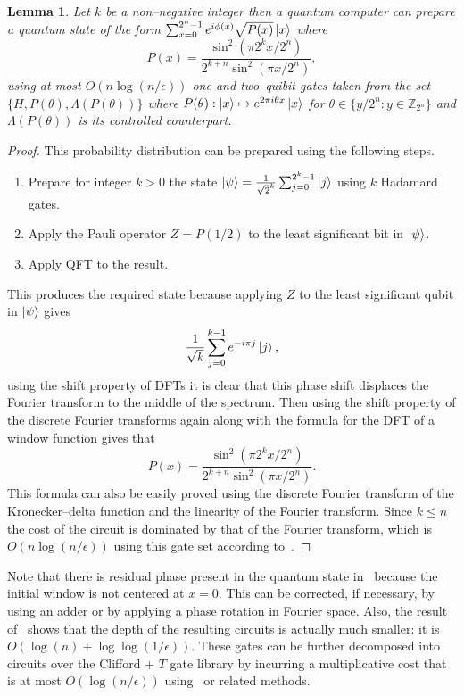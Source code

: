 \documentclass[aps,amsmath,onecolumn,amssymb]{revtex4}
\newtheorem{lemma}{Lemma}
\begin{document}
\begin{lemma}\label{lem:sinc}
Let $k$ be a non--negative integer then a quantum computer can prepare a quantum state of the form $\sum_{x=0}^{2^n-1} e^{i\phi(x)}\sqrt{P(x)}\left|x\right\rangle$ where
$$
P(x) = \frac{\sin^2(\pi 2^k x/2^n)}{2^{k+n} \sin^2(\pi x/2^n)},
$$
using at most $O(n\log(n/\epsilon))$ one and two--quibit gates taken from the set $\{H,P(\theta),\Lambda (P(\theta))\}$ where $P(\theta):\left|x\right\rangle\mapsto e^{2\pi i \theta x} \left|x\right\rangle$ for $\theta \in \{y/2^n:y\in \mathbb{Z}_{2^n}\}$ and $\Lambda (P(\theta))$ is its controlled counterpart.
\end{lemma}
\begin{proof}
This probability distribution can be prepared using the following steps.
\begin{enumerate}
\item Prepare for integer $k>0$ the state $\left|\psi\right\rangle=\frac{1}{\sqrt 2^k}\sum_{j=0}^{2^k-1} \left|j\right\rangle$ using $k$ Hadamard gates.
\item Apply the Pauli operator $Z=P(1/2)$ to the least significant bit in $\left|\psi\right\rangle$.
\item Apply QFT to the result.
\end{enumerate}
This produces the required state because applying $Z$ to the least significant qubit in $\left|\psi\right\rangle$ gives 
\begin{equation}
\frac{1}{\sqrt k}\sum_{j=0}^{k-1} e^{-i \pi j}\left|j\right\rangle,
\end{equation}
using the shift property of DFTs it is clear that this phase shift displaces the Fourier transform to the middle of the spectrum.
Then using the shift property of the discrete Fourier transforms again along with the formula for the DFT of a window function gives that
\begin{equation}
P(x) = \frac{\sin^2(\pi 2^k x/2^n)}{2^{k+n} \sin^2(\pi x/2^n)}.
\end{equation}
This formula can also be easily proved using the discrete Fourier transform of the Kronecker--delta function and the linearity of the Fourier transform.
Since $k\le n$ the cost of the circuit is dominated by that of the Fourier transform, which is $O(n\log(n/\epsilon))$ using this gate set according to~\cite{CW00}.
\end{proof}
  Note that there is residual phase present in the quantum state in~ because the initial window is not centered at $x=0$.  This can be corrected, if necessary, by using an adder or by applying a phase rotation in Fourier space.  Also, the result of~\cite{CW00} shows that the depth of the resulting circuits is actually much smaller: it is $O(\log(n) + \log \log(1/\epsilon))$.
These gates can be further decomposed into circuits over the Clifford + $T$ gate library by incurring a multiplicative cost that is at most $O(\log(n/\epsilon))$ using~\cite{KMM13} or related methods.
\end{document}
